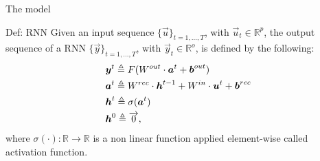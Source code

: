 
\begin{frame}{The model}
	
\begin{block}{Def: RNN}
	Given an input sequence $\{\vec{u}\}_{t=1,...,T}$, with $ \vec{u}_t \in \mathbb{R}^p$, the output sequence of a RNN $\{\vec{y}\}_{t=1,...,T}$, with $\vec{y}_t \in \mathbb{R}^o$,  is defined by the following:
\begin{align}
		&\boldsymbol{y}^t \triangleq F(W^{out}\cdot\boldsymbol{a}^t + \boldsymbol{b}^{out})\\
		&\boldsymbol{a}^t \triangleq W^{rec}\cdot\boldsymbol{h}^{t-1}+W^{in}\cdot\boldsymbol{u}^t+\boldsymbol{b}^{rec}\\
		&\boldsymbol{h}^t \triangleq  \sigma(\boldsymbol{a}^t) \\
		&\boldsymbol{h}^0 \triangleq \overrightarrow{0},
\end{align}
where $\sigma(\cdot):\mathbb{R}\rightarrow\mathbb{R}$ is a non linear function applied element-wise called activation function.
\end{block}
\end{frame}

